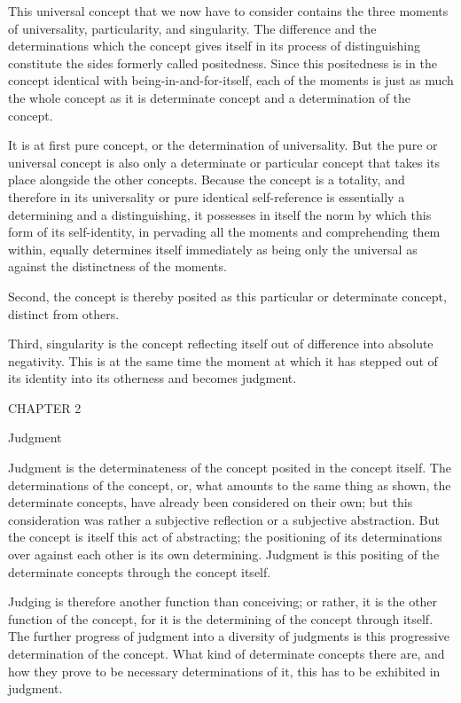 This universal concept that we now have to consider
contains the three moments of
universality, particularity, and singularity.
The difference and the determinations which the concept
gives itself in its process of distinguishing constitute
the sides formerly called positedness.
Since this positedness is in the concept
identical with being-in-and-for-itself,
each of the moments is just as much
the whole concept as it is determinate concept
and a determination of the concept.

It is at first pure concept,
or the determination of universality.
But the pure or universal concept is also
only a determinate or particular concept
that takes its place alongside the other concepts.
Because the concept is a totality,
and therefore in its universality
or pure identical self-reference
is essentially a determining and a distinguishing,
it possesses in itself the norm
by which this form of its self-identity,
in pervading all the moments
and comprehending them within,
equally determines itself immediately
as being only the universal
as against the distinctness of the moments.

Second, the concept is thereby posited
as this particular or determinate concept,
distinct from others.

Third, singularity is the concept reflecting itself
out of difference into absolute negativity.
This is at the same time the moment at which
it has stepped out of its identity
into its otherness and becomes judgment.

CHAPTER 2

Judgment

Judgment is the determinateness of the concept
posited in the concept itself.
The determinations of the concept,
or, what amounts to the same thing as shown,
the determinate concepts,
have already been considered on their own;
but this consideration was rather
a subjective reflection
or a subjective abstraction.
But the concept is itself this act of abstracting;
the positioning of its determinations over
against each other is its own determining.
Judgment is this positing of the determinate concepts
through the concept itself.

Judging is therefore another function than conceiving;
or rather, it is the other function of the concept,
for it is the determining of the concept through itself.
The further progress of judgment
into a diversity of judgments is
this progressive determination of the concept.
What kind of determinate concepts there are,
and how they prove to be necessary determinations of it,
this has to be exhibited in judgment.

